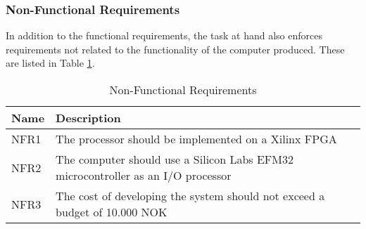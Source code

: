 \subsubsection{Non-Functional Requirements}

In addition to the functional requirements, the task at hand also enforces requirements not related to the functionality of the computer produced. These are listed in Table \ref{tab:NonFunctionalRequirements}.

\begin{table}[h]
    \centering
    \begin{tabular}{lp{12cm}l}
        Name & Description \\
        \hline
        NFR1 &
            The processor should be implemented on a Xilinx FPGA \\
        NFR2 &
            The computer should use a Silicon Labs EFM32 microcontroller as an I/O processor \\
        NFR3 &
            The cost of developing the system should not exceed a budget of 10.000 NOK \\
    \end{tabular}
    \caption{Non-Functional Requirements}
    \label{tab:NonFunctionalRequirements}
\end{table}

